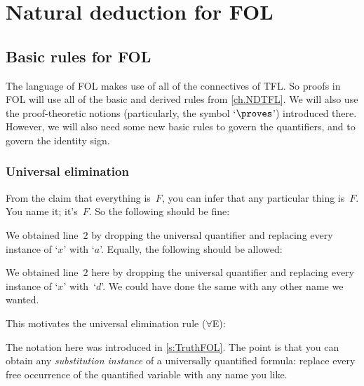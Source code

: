 \part{Natural deduction for FOL}
\label{ch.NDFOL}

\chapter{Basic rules for FOL}\label{s:BasicFOL}

The language of FOL makes use of all of the connectives of TFL. So proofs in FOL will use all of the basic and derived rules from \cref{ch.NDTFL}. We will also use the proof-theoretic notions (particularly, the symbol `$\proves$') introduced there. However, we will also need some new basic rules to govern the quantifiers, and to govern the identity sign.


\section{Universal elimination}\label{s:forallElim}

From the claim that everything is~$F$, you can infer that any particular thing is~$F$. You name it; it's~$F$. So the following should be fine:
\begin{fitchproof}
	\PR
	 
\end{fitchproof}
We obtained line~$2$ by dropping the universal quantifier and replacing every instance of `$x$' with `$a$'. Equally, the following should be allowed:
\begin{fitchproof}
	\PR
	 
\end{fitchproof}
We obtained line~$2$ here by dropping the universal quantifier and replacing every instance of `$x$' with~`$d$'. We could have done the same with any other name we wanted.

This motivates the universal elimination rule ($\forall$E):


The notation here was introduced in \cref{s:TruthFOL}. The point is
that you can obtain any \emph{substitution instance} of a universally
quantified formula: replace every free occurrence of the quantified
variable with any name you like.

